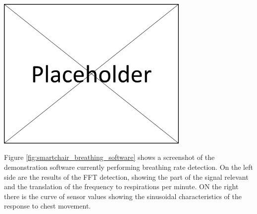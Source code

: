 \begin{minipage}{\linewidth}
\centering
\includegraphics[width=0.7\textwidth]{images/placeholder}
\label{fig:smartchair_breathing_software}
\end{minipage}

Figure \ref{fig:smartchair_breathing_software} shows a screenshot of the demonstration software currently performing breathing rate detection. On the left side are the results of the FFT detection, showing the part of the signal relevant and the translation of the frequency to respirations per minute. ON the right there is the curve of sensor values showing the sinusoidal characteristics of the response to chest movement.

